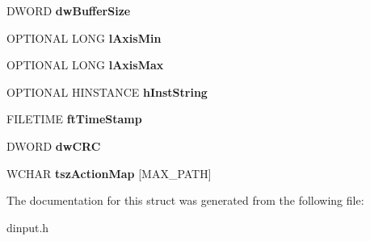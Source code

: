 \begin{DoxyCompactItemize}
\item 
\hypertarget{struct___d_i_a_c_t_i_o_n_f_o_r_m_a_t_w_a3dd59991b7a558c12ba2e1d4f1ec9800}{D\-W\-O\-R\-D {\bfseries dw\-Buffer\-Size}}\label{struct___d_i_a_c_t_i_o_n_f_o_r_m_a_t_w_a3dd59991b7a558c12ba2e1d4f1ec9800}

\item 
\hypertarget{struct___d_i_a_c_t_i_o_n_f_o_r_m_a_t_w_a14670e58ce40ed67176e4a55f0cedb26}{O\-P\-T\-I\-O\-N\-A\-L L\-O\-N\-G {\bfseries l\-Axis\-Min}}\label{struct___d_i_a_c_t_i_o_n_f_o_r_m_a_t_w_a14670e58ce40ed67176e4a55f0cedb26}

\item 
\hypertarget{struct___d_i_a_c_t_i_o_n_f_o_r_m_a_t_w_abca265bb336b9a205e1a62c567cb82af}{O\-P\-T\-I\-O\-N\-A\-L L\-O\-N\-G {\bfseries l\-Axis\-Max}}\label{struct___d_i_a_c_t_i_o_n_f_o_r_m_a_t_w_abca265bb336b9a205e1a62c567cb82af}

\item 
\hypertarget{struct___d_i_a_c_t_i_o_n_f_o_r_m_a_t_w_a591b9b07a73604179b274aae8f521dce}{O\-P\-T\-I\-O\-N\-A\-L H\-I\-N\-S\-T\-A\-N\-C\-E {\bfseries h\-Inst\-String}}\label{struct___d_i_a_c_t_i_o_n_f_o_r_m_a_t_w_a591b9b07a73604179b274aae8f521dce}

\item 
\hypertarget{struct___d_i_a_c_t_i_o_n_f_o_r_m_a_t_w_a625dcc3552abd77fa8da36ad7f120b4b}{F\-I\-L\-E\-T\-I\-M\-E {\bfseries ft\-Time\-Stamp}}\label{struct___d_i_a_c_t_i_o_n_f_o_r_m_a_t_w_a625dcc3552abd77fa8da36ad7f120b4b}

\item 
\hypertarget{struct___d_i_a_c_t_i_o_n_f_o_r_m_a_t_w_aee1fe8223c171177d004449104d400f1}{D\-W\-O\-R\-D {\bfseries dw\-C\-R\-C}}\label{struct___d_i_a_c_t_i_o_n_f_o_r_m_a_t_w_aee1fe8223c171177d004449104d400f1}

\item 
\hypertarget{struct___d_i_a_c_t_i_o_n_f_o_r_m_a_t_w_a93b4fd7ad1b6916a3d5f00e379ecc2ce}{W\-C\-H\-A\-R {\bfseries tsz\-Action\-Map} \mbox{[}M\-A\-X\-\_\-\-P\-A\-T\-H\mbox{]}}\label{struct___d_i_a_c_t_i_o_n_f_o_r_m_a_t_w_a93b4fd7ad1b6916a3d5f00e379ecc2ce}

\end{DoxyCompactItemize}


The documentation for this struct was generated from the following file\-:\begin{DoxyCompactItemize}
\item 
dinput.\-h\end{DoxyCompactItemize}
